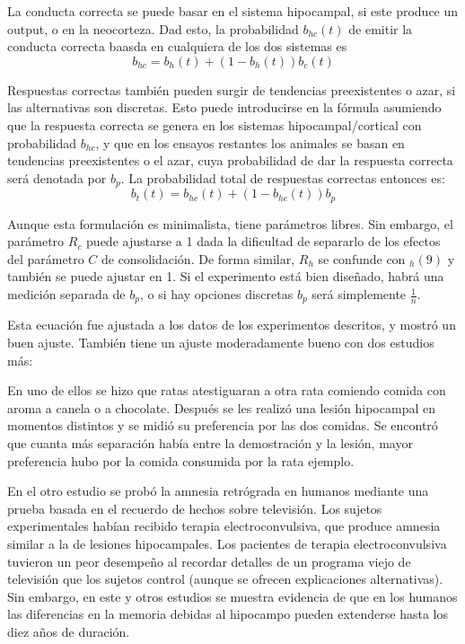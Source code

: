 \documentclass[a4paper,12pt]{article}
\begin{document}
La conducta correcta se puede basar en el sistema hipocampal, si este produce un output, o en la neocorteza. Dad esto, la probabilidad $b_{hc}(t)$ de emitir la conducta correcta baasda en cualquiera de los  dos sistemas es 
\begin{equation}
	b_{hc}=
	b_{h}(t)
	+
	(1-b_{h}(t))
	b_{c}(t)
\end{equation}


Respuestas correctas también pueden surgir de tendencias preexistentes o azar, si las alternativas son discretas. Esto puede introducirse en la fórmula asumiendo que la respuesta correcta se genera en los sistemas hipocampal/cortical con probabilidad $b_{hc}$, y que en los ensayos restantes los animales se basan en tendencias preexistentes  o el azar, cuya probabilidad de dar la respuesta correcta será denotada por $b_{p}$. La probabilidad total de respuestas correctas  entonces es:
\begin{equation}
	b_{t}(t) =
	b_{hc}(t)
	+
	(1-b_{hc}(t)) b_{p}
\end{equation}

Aunque esta formulación es minimalista, tiene parámetros libres. Sin embargo, el parámetro $R_{c}$ puede ajustarse a 1 dada la dificultad de separarlo de los efectos del parámetro $C$  de consolidación. De forma similar, $R_{h}$ se confunde con $_{h}(9)$ y también se puede ajustar en 1. Si el experimento está bien diseñado, habrá una medición separada de $b_{p}$, o si hay opciones discretas $b_{p}$ será simplemente $\frac{1}{n}$.

Esta ecuación fue ajustada a los datos de los experimentos descritos, y mostró un buen ajuste. También tiene un ajuste moderadamente bueno con dos estudios más:

En uno de ellos se hizo que ratas atestiguaran a otra rata comiendo comida con aroma a canela o a chocolate. Después se les realizó una lesión hipocampal en momentos distintos y se midió su preferencia por las dos comidas. Se encontró que cuanta más separación había entre la demostración y la lesión, mayor preferencia hubo por la comida consumida por la rata ejemplo. 

En el otro estudio se probó la amnesia retrógrada en humanos mediante una prueba basada en el recuerdo de hechos sobre televisión. Los sujetos experimentales habían recibido terapia electroconvulsiva, que produce amnesia similar a la de lesiones hipocampales. Los pacientes de terapia electroconvulsiva tuvieron un peor desempeño al recordar detalles de un programa viejo de televisión que los sujetos control (aunque se ofrecen explicaciones alternativas). Sin embargo, en este y otros estudios se muestra evidencia de que en los humanos las diferencias en la memoria debidas al hipocampo pueden extenderse hasta los diez años de duración.
\end{document}
